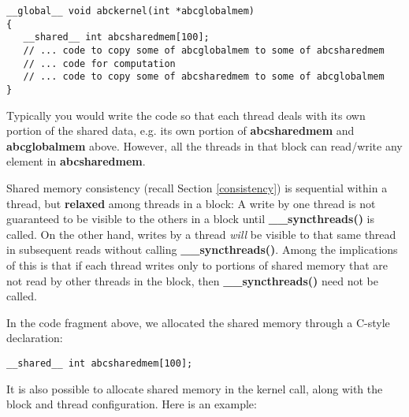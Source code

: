\begin{Verbatim}[fontsize=\relsize{-2}]
__global__ void abckernel(int *abcglobalmem)
{
   __shared__ int abcsharedmem[100];
   // ... code to copy some of abcglobalmem to some of abcsharedmem
   // ... code for computation
   // ... code to copy some of abcsharedmem to some of abcglobalmem
}
\end{Verbatim}

Typically you would write the code so that each thread deals with its
own portion of the shared data, e.g. its own portion of {\bf
abcsharedmem} and {\bf abcglobalmem} above.  However, all the threads in
that block can read/write any element in {\bf abcsharedmem}. 

Shared memory consistency (recall Section \ref{consistency}) is
sequential within a thread, but {\bf relaxed} among threads in a block:
A write by one thread is not guaranteed to be visible to the others in a
block until {\bf \_\_syncthreads()} is called.  On the other hand,
writes by a thread {\it will} be visible to that same thread in
subsequent reads without calling {\bf \_\_syncthreads()}.  Among the
implications of this is that if each thread writes only to portions of
shared memory that are not read by other threads in the block, then {\bf
\_\_syncthreads()} need not be called.

In the code fragment above, we allocated the shared memory through a
C-style declaration:

\begin{Verbatim}[fontsize=\relsize{-2}]
__shared__ int abcsharedmem[100];
\end{Verbatim}

It is also possible to allocate shared memory in the kernel call, along
with the block and thread configuration.  Here is an example:

